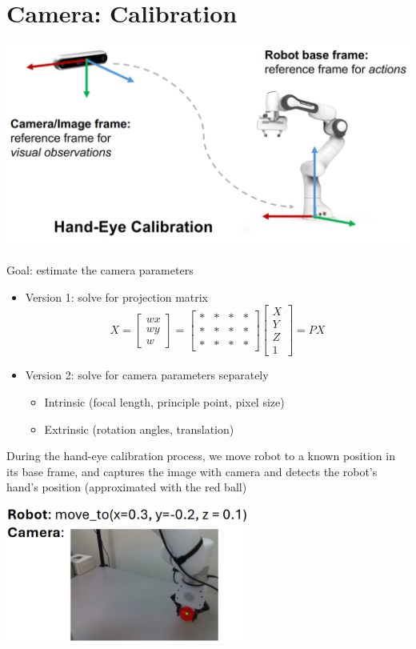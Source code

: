 \documentclass[10pt]{article}
\begin{document}
\section*{Camera: Calibration}
\begin{center} 
	\includegraphics*[width=\textwidth]{L2_1.png} 
\end{center}
Goal: estimate the camera parameters
\begin{itemize}
	\item Version 1: solve for projection matrix
	\[X = \begin{bmatrix} wx \\ wy \\ w \end{bmatrix} = \begin{bmatrix} * & * & * & * \\ * & * & * & * \\ * & * & * & * \end{bmatrix} \begin{bmatrix} X \\ Y \\ Z \\ 1 \end{bmatrix} = PX\]
    \item Version 2: solve for camera parameters separately
    \begin{itemize}
        \item Intrinsic (focal length, principle point, pixel size)
        \item Extrinsic (rotation angles, translation)
    \end{itemize}
\end{itemize}
During the hand-eye calibration process, we move robot to a known position in its base frame, and captures the image with camera and detects the robot's hand's position (approximated with the red ball)
\begin{center} 
	\includegraphics*[width=0.6\textwidth]{L2_2.png} 
\end{center}
\end{document}

